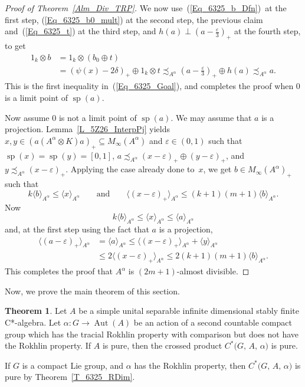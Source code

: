 \documentclass[10pt]{amsart}
\numberwithin{equation}{section}
\theoremstyle{definition}
\newtheorem{thm}{Theorem}[section]
\newcommand{\af}{\alpha}
\newcommand{\dt}{\delta}
\newcommand{\ep}{\varepsilon}
\newcommand{\ps}{\psi}
\newcommand{\spec}{{\operatorname{sp}}}
\newcommand{\Aut}{{\operatorname{Aut}}}
\newcommand{\Mi}{M_{\infty}}
\newcommand{\andeqn}{\qquad {\mbox{and}} \qquad}
\newcommand{\pj}{projection}
\renewcommand{\S}{\subseteq}
\newcommand{\I}{\infty}
\newcommand{\cc}[1]{\langle #1 \rangle}
\begin{document}
\begin{proof}[Proof of Theorem~\ref{Alm_Div_TRP}]
We now use~(\ref{Eq_6325_b_Dfn})~at the first step,
(\ref{Eq_6325_b0_mult}) at the second step,
the previous claim and~(\ref{Eq_6325_t}) at the third step,
and $h (a) \perp \left( a - \frac{\ep}{3} \right)_+$ at the fourth step,
to get
\[
\begin{split}
1_{k} \otimes b
& = 1_{k} \otimes (b_0 \oplus t)
\\
& = (\ps (x) - 2 \dt)_{+} \oplus 1_{k} \otimes t
  \precsim_{A^{\af}} \left( a - \frac{\ep}{3} \right)_+
    \oplus h (a)
  \precsim_{A^{\af}} a.
\end{split}
\]
This is the first inequality in~(\ref{Eq_6325_Goal}),
and completes the proof when $0$ is a limit point of $\spec (a)$.

Now assume $0$ is not a limit point of $\spec (a)$.
We may assume that $a$ is a \pj.
Lemma~\ref{L_5Z26_InterpPj} yields
$x, y \in (a (A^{\af} \otimes K) a)_{+} \S \Mi (A^{\af})$
and $\ep \in (0, 1)$
such that $\spec (x) = \spec (y) = [0, 1]$,
$a \precsim_{A^{\af}} (x - \ep)_{+} \oplus (y - \ep)_{+}$,
and $y \precsim_{A^{\af}} (x - \ep)_{+}$.
Applying the case already done to~$x$,
we get $b \in M_{\I} (A^{\alpha})_+$ such that
\[
k \cc{b}_{A^{\alpha}} \leq \cc{x}_{A^{\alpha}}
\andeqn
\cc{(x - \ep)_+}_{A^{\alpha}} \leq (k + 1) (m + 1) \cc{b}_{A^{\alpha}}.
\]
Now
\[
k \cc{b}_{A^{\alpha}} \leq \cc{x}_{A^{\alpha}} \leq \cc{a}_{A^{\alpha}}
\]
and, at the first step using the fact that $a$ is a \pj,
\[
\begin{split}
\cc{(a - \ep)_{+}}_{A^{\alpha}}
& = \cc{a}_{A^{\alpha}}
  \leq \cc{(x - \ep)_{+}}_{A^{\alpha}} + \cc{y}_{A^{\alpha}}
\\
& \leq 2 \cc{(x - \ep)_{+}}_{A^{\alpha}}
  \leq 2 (k + 1) (m + 1) \cc{b}_{A^{\alpha}}.
\end{split}
\]
This completes the proof that $A^{\alpha}$ is $(2 m + 1)$-almost divisible.
\end{proof}

Now, we prove the main theorem of this section.

\begin{thm}\label{T_6326_TRP_pure}
Let $A$ be a simple unital separable infinite dimensional stably finite
C*-algebra.
Let $\alpha \colon G \to \Aut(A)$ be an action of a second countable
compact group which has the tracial Rokhlin property with comparison
but does not have the Rokhlin property.
If $A$ is pure, then the crossed product
$C^* \bigl( G, \, A, \, \af \bigr)$ is pure.
\end{thm}

If $G$ is a compact Lie group, and $\af$ has the Rokhlin property,
then $C^* \bigl( G, \, A, \, \af \bigr)$ is pure by
Theorem~\ref{T_6325_RDim}.
\end{document}
